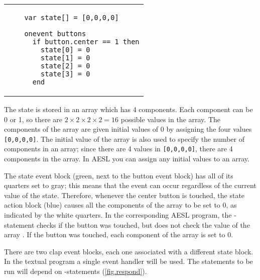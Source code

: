 \begin{center}
\begin{tabular}{ll}
\raisebox{8ex}{\texttt{[image: two-button]}} &
\begin{minipage}[b]{.5\textwidth}
\begin{footnotesize}
\begin{verbatim}
  var state[] = [0,0,0,0]
  
  onevent buttons
    if button.center == 1 then
      state[0] = 0
      state[1] = 0
      state[2] = 0
      state[3] = 0
    end
\end{verbatim}
\end{footnotesize}
\end{minipage}
\end{tabular}
\end{center}

The state is stored in an array  which has 4 components. Each
component can be 0 or 1, so there are $2\times 2\times 2\times 2=16$
possible values in the array. The components of the array are given
initial values of 0 by assigning the four values {\footnotesize\verb+[0,0,0,0]+}. The
initial value of the array is also used to specify the number of
components in an array; since there are 4 values in {\footnotesize\verb+[0,0,0,0]+},
there are 4 components in the array. In AESL you can assign any initial
values to an array.

The state event block (green, next to the button event block) has all of
its quarters set to gray; this means that the event can occur regardless
of the current value of the state. Therefore, whenever the center button
is touched, the state action block (blue) causes all the components of
the array  to be set to 0, as indicated by the white quarters.
In the corresponding AESL program, the -statement checks if the
button was touched, but does not check the value of the array .
If the button was touched, each component of the array is set to 0.

There are two clap event blocks, each one associated with a different
state block. In the textual program a single  event handler will
be used. The statements to be run will depend on -statements
(\cref{fig.respond}).

